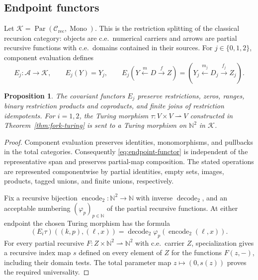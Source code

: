 \documentclass[11pt]{article}
\newtheorem{proposition}[theorem]{Proposition}
\newcommand{\N}{\mathbb N}
\begin{document}
\subsection{Endpoint functors}

Let
$\mathcal K=\operatorname{Par}(\mathcal C_{\mathrm{rec}},\operatorname{Mono})$.
This is the restriction splitting of the classical recursion category:
objects are c.e.\ numerical carriers and arrows are partial recursive
functions with c.e.\ domains contained in their sources.
For $j\in\{0,1,2\}$, component evaluation defines
\begin{equation}\label{eq:endpoint-functor}
 E_j:\mathcal A\longrightarrow\mathcal K,\qquad
 E_j(Y)=Y_j,\qquad
 E_j(Y\xleftarrow{m}D\xrightarrow{f}Z)
   =(Y_j\xleftarrow{m_j}D_j\xrightarrow{f_j}Z_j).
\end{equation}

\begin{proposition}\label{prop:endpoint}
The covariant functors $E_j$ preserve restrictions, zeros, ranges,
binary restriction products and coproducts, and finite joins of
restriction idempotents.
For $i=1,2$, the Turing morphism
$\tau:V\times V\rightharpoonup V$ constructed in
Theorem~\ref{thm:fork-turing} is sent
to a Turing morphism on $\N^2$ in $\mathcal K$.
\end{proposition}
\begin{proof}
Component evaluation preserves identities, monomorphisms, and
pullbacks in the total categories. Consequently \eqref{eq:endpoint-functor}
is independent of the representative span and preserves partial-map
composition. The stated operations are represented componentwise by
partial identities, empty sets, images, products, tagged unions, and
finite unions, respectively.

Fix a recursive bijection $\operatorname{encode}_2:\N^2\to\N$
with inverse $\operatorname{decode}_2$, and an acceptable numbering
$(\varphi_p)_{p\in\N}$ of the partial recursive functions.
At either endpoint the chosen
Turing morphism has the formula
\[
 (E_i\tau)((k,p),(\ell,x))
 =\operatorname{decode}_2\varphi_p(\operatorname{encode}_2(\ell,x)).
\]
For every partial recursive
$F:Z\times\N^2\rightharpoonup\N^2$ with c.e.\ carrier $Z$,
specialization gives a recursive index map $s$ defined on every
element of $Z$ for
the functions $F(z,-)$, including their domain tests.
The total parameter map $z\mapsto(0,s(z))$ proves the required
universality.
\end{proof}
\end{document}
